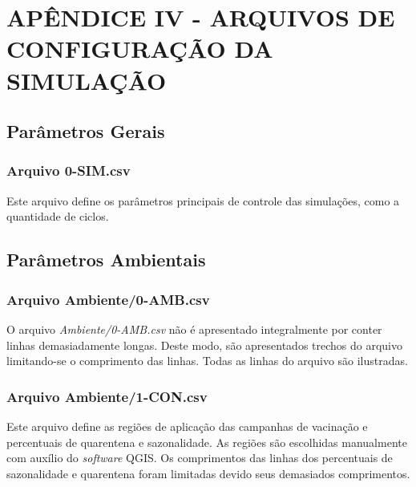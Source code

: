 \section{APÊNDICE IV - ARQUIVOS DE CONFIGURAÇÃO DA SIMULAÇÃO}

\subsection{Parâmetros Gerais}

\subsubsection{Arquivo 0-SIM.csv} 

Este arquivo define os parâmetros principais de controle das simulações, como a quantidade de ciclos. 

\begin{center}
\end{center}

\newpage

\subsection{Parâmetros Ambientais}

\subsubsection{Arquivo Ambiente/0-AMB.csv}

O arquivo \textit{Ambiente/0-AMB.csv} não é apresentado integralmente por conter linhas demasiadamente longas. Deste modo, são apresentados trechos do arquivo limitando-se o comprimento das linhas. Todas as linhas do arquivo são ilustradas. 



\newpage

\subsubsection{Arquivo Ambiente/1-CON.csv}

Este arquivo define as regiões de aplicação das campanhas de vacinação e percentuais de quarentena e sazonalidade. As regiões são escolhidas manualmente com auxílio do \textit{software} QGIS. Os comprimentos das linhas dos percentuais de sazonalidade e quarentena foram limitadas devido seus demasiados comprimentos.

